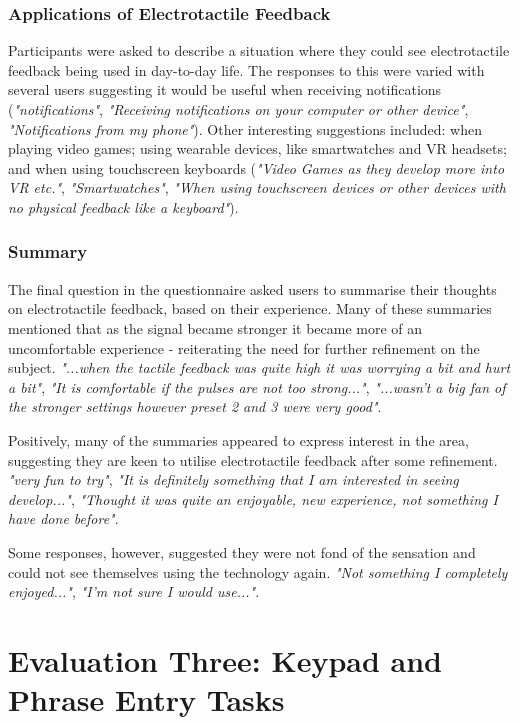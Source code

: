 \documentclass{mpaper}
\begin{document}
\subsubsection{Applications of Electrotactile Feedback}
Participants were asked to describe a situation where they could see electrotactile feedback being used in day-to-day life. The responses to this were varied with several users suggesting it would be useful when receiving notifications (\emph{"notifications"}, \emph{"Receiving notifications on your computer or other device"}, \emph{"Notifications from my phone"}). Other interesting suggestions included: when playing video games; using wearable devices, like smartwatches and VR headsets; and when using touchscreen keyboards (\emph{"Video Games as they develop more into VR etc."}, \emph{"Smartwatches"}, \emph{"When using touchscreen devices or other devices with no physical feedback like a keyboard"}).

\subsubsection{Summary}
The final question in the questionnaire asked users to summarise their thoughts on electrotactile feedback, based on their experience. Many of these summaries mentioned that as the signal became stronger it became more of an uncomfortable experience - reiterating the need for further refinement on the subject. \emph{"...when the tactile feedback was quite high it was worrying a bit and hurt a bit"}, \emph{"It is comfortable if the pulses are not too strong..."}, \emph{"...wasn't a big fan of the stronger settings however preset 2 and 3 were very good"}.

Positively, many of the summaries appeared to express interest in the area, suggesting they are keen to utilise electrotactile feedback after some refinement. \emph{"very fun to try"}, \emph{"It is definitely something that I am interested in seeing develop..."}, \emph{"Thought it was quite an enjoyable, new experience, not something I have done before"}.

Some responses, however, suggested they were not fond of the sensation and could not see themselves using the technology again. \emph{"Not something I completely enjoyed..."}, \emph{"I'm not sure I would use..."}.

\section{Evaluation Three: Keypad and\\Phrase Entry Tasks}
\end{document}
